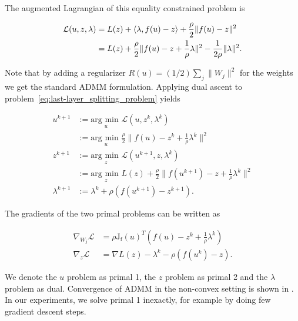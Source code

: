 \documentclass[english,11pt,a4paper]{article}
\begin{document}
The augmented Lagrangian of this equality constrained problem is

\begin{equation}
	\begin{aligned}
		\mathcal{L}(u, z, \lambda)
		&= L(z) + \langle \lambda, f(u)-z \rangle + \frac{\rho}{2} \| f(u)-z \|^2 \\
		&= L(z) + \frac{\rho}{2} \| f(u) - z + \frac{1}{\rho} \lambda \|^2 - \frac{1}{2 \rho} \| \lambda \|^2.
	\end{aligned}
\end{equation}

Note that by adding a regularizer $R(u) = (1/2) \sum_{j} \| W_j \|^2$ for the weights we get the standard ADMM formulation. Applying dual ascent to problem~\ref{eq:last-layer_splitting_problem} yields

\begin{equation}
	\begin{aligned}
		u^{k+1} &:= \underset{u}{\text{arg min }} \mathcal{L}(u, z^k, \lambda^k) \\
		&:= \underset{u}{\text{arg min }} \frac{\rho}{2} \| f(u) - z^k + \frac{1}{\rho} \lambda^k \|^2 \\
	
		z^{k+1} &:= \underset{z}{\text{arg min }} \mathcal{L}(u^{k+1}, z, \lambda^k) \\
		&:= \underset{z}{\text{arg min }} L(z) + \frac{\rho}{2} \| f(u^{k+1}) - z + \frac{1}{\rho} \lambda^k \|^2 \\
		
		\lambda^{k+1} &:= \lambda^k + \rho (f(u^{k+1})-z^{k+1}).
	\end{aligned}
\end{equation}

The gradients of the two primal problems can be written as

\begin{equation}
	\begin{aligned}
		\nabla_{W_j} \mathcal{L} &= \rho \mathrm{J_f}(u)^T (f(u) - z^k + \frac{1}{\rho} \lambda^k) \\
		\nabla_z \mathcal{L} &= \nabla L(z) - \lambda^k - \rho (f(u^k) - z).
	\end{aligned}
\end{equation}

We denote the $u$ problem as primal 1, the $z$ problem as primal 2 and the $\lambda$ problem as dual. Convergence of ADMM in the non-convex setting is shown in \cite{hong2016convergence}. In our experiments, we solve primal 1 inexactly, for example by doing few gradient descent steps.
\end{document}
